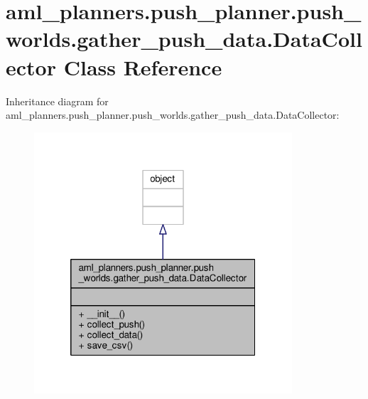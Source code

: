 \hypertarget{classaml__planners_1_1push__planner_1_1push__worlds_1_1gather__push__data_1_1_data_collector}{\section{aml\-\_\-planners.\-push\-\_\-planner.\-push\-\_\-worlds.\-gather\-\_\-push\-\_\-data.\-Data\-Collector Class Reference}
\label{classaml__planners_1_1push__planner_1_1push__worlds_1_1gather__push__data_1_1_data_collector}
}


Inheritance diagram for aml\-\_\-planners.\-push\-\_\-planner.\-push\-\_\-worlds.\-gather\-\_\-push\-\_\-data.\-Data\-Collector\-:
\nopagebreak
\begin{figure}[H]
\begin{center}
\leavevmode
\includegraphics[width=272pt]{classaml__planners_1_1push__planner_1_1push__worlds_1_1gather__push__data_1_1_data_collector__inherit__graph}
\end{center}
\end{figure}


